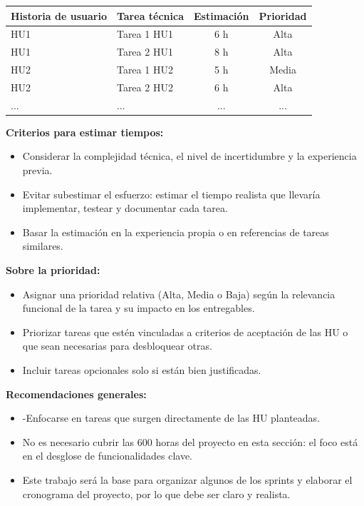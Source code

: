 \documentclass[
11pt, %
]{charter}
\begin{document}
\begin{table}[htpb]
\centering
\begin{tabularx}{\linewidth}{@{}|X|X|c|c|@{}}
\hline
\rowcolor[HTML]{C0C0C0}
Historia de usuario & Tarea técnica & Estimación & Prioridad \\ \hline
HU1 & Tarea 1 HU1 & 6 h & Alta \\ \hline
HU1 & Tarea 2 HU1 & 8 h & Alta \\ \hline
HU2 & Tarea 1 HU2 & 5 h & Media \\ \hline
HU2 & Tarea 2 HU2 & 6 h & Alta \\ \hline
... & ... & ... & ... \\ \hline
\end{tabularx}
\end{table}

\textbf{Criterios para estimar tiempos:}
\begin{itemize}
  \item Considerar la complejidad técnica, el nivel de incertidumbre y la experiencia previa.
  \item Evitar subestimar el esfuerzo: estimar el tiempo realista que llevaría implementar, testear y documentar cada tarea.
  \item Basar la estimación en la experiencia propia o en referencias de tareas similares.
\end{itemize}

\textbf{Sobre la prioridad:}
\begin{itemize}
  \item Asignar una prioridad relativa (Alta, Media o Baja) según la relevancia funcional de la tarea y su impacto en los entregables.
  \item Priorizar tareas que estén vinculadas a criterios de aceptación de las HU o que sean necesarias para desbloquear otras.
  \item Incluir tareas opcionales solo si están bien justificadas.
\end{itemize}

\textbf{Recomendaciones generales:}
\begin{itemize}
  \item -Enfocarse en tareas que surgen directamente de las HU planteadas.
  \item No es necesario cubrir las 600 horas del proyecto en esta sección: el foco está en el desglose de funcionalidades clave.
  \item Este trabajo será la base para organizar algunos de los sprints y elaborar el cronograma del proyecto, por lo que debe ser claro y realista.
\end{itemize}
\end{document}
